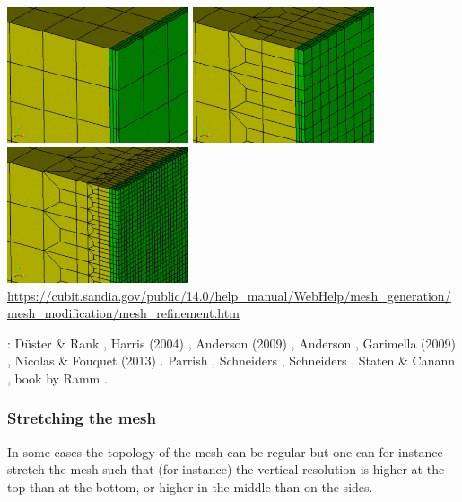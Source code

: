 \begin{center}
\includegraphics[height=4cm]{images/meshes/refine_mesh_sheet_directional1}
\includegraphics[height=4cm]{images/meshes/refine_mesh_sheet_directional2}
\includegraphics[height=4cm]{images/meshes/refine_mesh_sheet_directional4}\\
\url{https://cubit.sandia.gov/public/14.0/help_manual/WebHelp/mesh_generation/mesh_modification/mesh_refinement.htm}
\end{center}

\Literature: 
D{\"u}ster \& Rank \cite{dura01},
Harris \etal (2004) \cite{habo04},
Anderson \etal (2009) \cite{anbo09},
Anderson \cite{ande09}, 
Garimella (2009) \cite{gari09},
Nicolas \& Fouquet (2013) \cite{nifo13,nifo13b}.
Parrish \cite{parr07}, 
Schneiders \cite{schn00,schn96,schn96b,schn99},
Schneiders \etal \cite{scde95},
Staten \& Canann \cite{stca97},
book by Ramm \etal \cite{rarr03}.


\subsubsection{Stretching the mesh}

In some cases the topology of the mesh can be regular but one can for instance stretch 
the mesh such that (for instance) the vertical resolution is higher at the top than at the bottom, 
or higher in the middle than on the sides.


